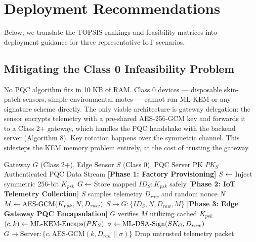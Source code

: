 \section{Deployment Recommendations}
\label{sec:deployment}

Below, we translate the TOPSIS rankings and feasibility matrices into deployment guidance for three representative IoT scenarios.

\subsection{Mitigating the Class 0 Infeasibility Problem}

No PQC algorithm fits in 10 KB of RAM. Class 0 devices — disposable skin-patch sensors, simple environmental motes — cannot run ML-KEM or any signature scheme directly. The only viable architecture is gateway delegation: the sensor encrypts telemetry with a pre-shared AES-256-GCM key and forwards it to a Class 2+ gateway, which handles the PQC handshake with the backend server (Algorithm 8). Key rotation happens over the symmetric channel. This sidesteps the KEM memory problem entirely, at the cost of trusting the gateway.

\begin{algorithm}[htbp]
\caption{Class 0 Gateway Crypto-Delegation Protocol}
\label{alg:gateway}
\begin{algorithmic}[1]
\Require Gateway $G$ (Class 2+), Edge Sensor $S$ (Class 0), PQC Server PK $PK_S$
\Ensure Authenticated PQC Data Stream
\State \textbf{[Phase 1: Factory Provisioning]}
\State $S \gets$ Inject symmetric 256-bit $K_{psk}$
\State $G \gets$ Store mapped $ID_S: K_{psk}$ safely
\State \textbf{[Phase 2: IoT Telemetry Collection]}
\State $S$ samples telemetry $D_{raw}$ and random nonce $N$
\State $M \gets \text{AES-GCM}(K_{psk}, N, D_{raw})$
\State $S \to G: \{ID_S, N, D_{raw}, M\}$
\State \textbf{[Phase 3: Edge Gateway PQC Encapsulation]}
\State $G$ verifies $M$ utilizing cached $K_{psk}$
 \State $(c, k) \gets \text{ML-KEM-Encaps}(PK_S)$
 \State $\sigma \gets \text{ML-DSA-Sign}(SK_G, D_{raw})$
 \State $G \to \text{Server}: \{c, \text{AES-GCM}(k, D_{raw} \parallel \sigma)\}$
\Else
 \State Drop untrusted telemetry packet
\EndIf
\end{algorithmic}
\end{algorithm}

